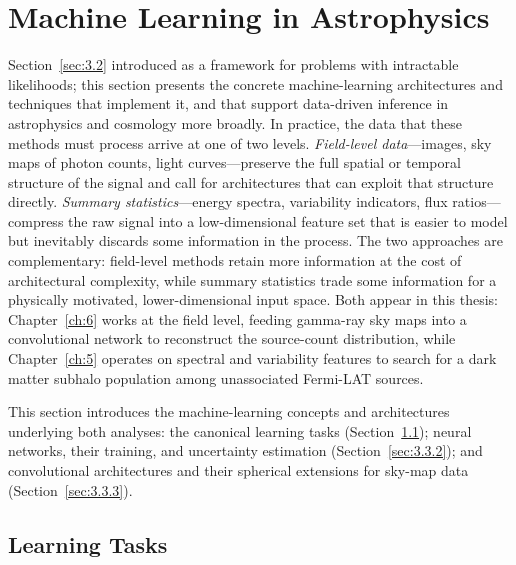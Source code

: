 \section{Machine Learning in Astrophysics}
\label{sec:3.3}

Section~\ref{sec:3.2} introduced \SBI as a framework for problems with intractable likelihoods; this section presents the concrete machine-learning architectures and techniques that implement it, and that support data-driven inference in astrophysics and cosmology more broadly.
In practice, the data that these methods must process arrive at one of two levels.
\emph{Field-level data}---images, sky maps of photon counts, light curves---preserve the full spatial or temporal structure of the signal and call for architectures that can exploit that structure directly.
\emph{Summary statistics}---energy spectra, variability indicators, flux ratios---compress the raw signal into a low-dimensional feature set that is easier to model but inevitably discards some information in the process.
The two approaches are complementary: field-level methods retain more information at the cost of architectural complexity, while summary statistics trade some information for a physically motivated, lower-dimensional input space.
Both appear in this thesis: Chapter~\ref{ch:6} works at the field level, feeding gamma-ray sky maps into a convolutional network to reconstruct the source-count distribution, while Chapter~\ref{ch:5} operates on spectral and variability features to search for a dark matter subhalo population among unassociated Fermi-LAT sources.

This section introduces the machine-learning concepts and architectures underlying both analyses: the canonical learning tasks (Section~\ref{sec:3.3.1}); neural networks, their training, and uncertainty estimation (Section~\ref{sec:3.3.2}); and convolutional architectures and their spherical extensions for sky-map data (Section~\ref{sec:3.3.3}).

\subsection{Learning Tasks}
\label{sec:3.3.1}

